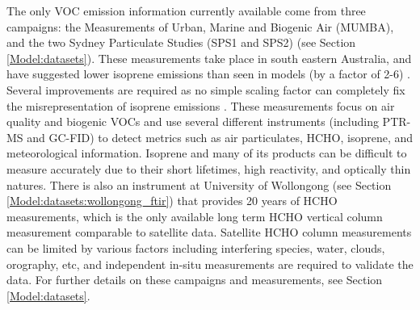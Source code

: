     
    The only VOC emission information currently available come from three campaigns: the Measurements of Urban, Marine and Biogenic Air (MUMBA), and the two Sydney Particulate Studies (SPS1 and SPS2) (see Section \ref{Model:datasets}).
    These measurements take place in south eastern Australia, and have suggested lower isoprene emissions than seen in models (by a factor of 2-6) \parencite{Emmerson2016}.
    Several improvements are required as no simple scaling factor can completely fix the misrepresentation of isoprene emissions \parencite{Emmerson2016}.
    These measurements focus on air quality and biogenic VOCs and use several different instruments (including PTR-MS and GC-FID) to detect metrics such as air particulates, HCHO, isoprene, and meteorological information.
    Isoprene and many of its products can be difficult to measure accurately due to their short lifetimes, high reactivity, and optically thin natures.
    There is also an instrument at University of Wollongong (see Section \ref{Model:datasets:wollongong_ftir}) that provides 20 years of HCHO measurements, which is the only available long term HCHO vertical column measurement comparable to satellite data. 
    Satellite HCHO column measurements can be limited by various factors including interfering species, water, clouds, orography, etc, and independent in-situ measurements are required to validate the data. %
    For further details on these campaigns and measurements, see Section \ref{Model:datasets}.
    
